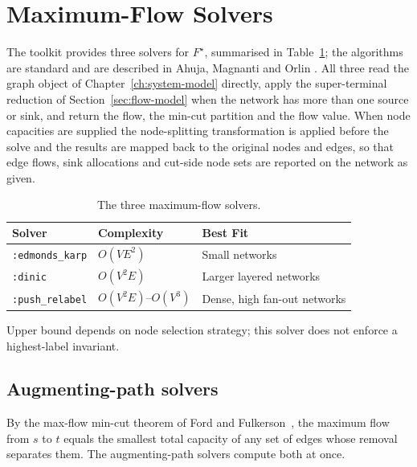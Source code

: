 \documentclass[12pt]{report}
\begin{document}
\clearpage

\section{Maximum-Flow Solvers}
\label{sec:flow-solvers}
The toolkit provides three solvers for $F^\star$, summarised in Table~\ref{tab:solver_comparison}; the algorithms are standard and are described in Ahuja, Magnanti and Orlin \cite{ahuja_network_2014}. All three read the graph object of Chapter~\ref{ch:system-model} directly, apply the super-terminal reduction of Section~\ref{sec:flow-model} when the network has more than one source or sink, and return the flow, the min-cut partition and the flow value. When node capacities are supplied the node-splitting transformation is applied before the solve and the results are mapped back to the original nodes and edges, so that edge flows, sink allocations and cut-side node sets are reported on the network as given.

\begin{table}[ht]
\centering
\begin{threeparttable}
\begin{tabular}{p{3cm} p{4.5cm} p{4.5cm}}
\toprule
\textbf{Solver} & \textbf{Complexity} & \textbf{Best Fit} \\
\midrule
\texttt{:edmonds\_karp} & $O(VE^2)$ & Small networks \\
\texttt{:dinic}         & $O(V^2E)$ & Larger layered networks \\
\texttt{:push\_relabel} & $O(V^2E)$--$O(V^3)$\tnote{a} & Dense, high fan-out networks \\
\bottomrule
\end{tabular}
\begin{tablenotes}
\footnotesize
\item[a] Upper bound depends on node selection strategy; this solver does not enforce a highest-label invariant.
\end{tablenotes}
\end{threeparttable}
\caption{The three maximum-flow solvers.}
\label{tab:solver_comparison}
\end{table}

\subsection{Augmenting-path solvers}

By the max-flow min-cut theorem of Ford and Fulkerson~\cite{ford1956,ford1962}, the maximum flow from $s$ to $t$ equals the smallest total capacity of any set of edges whose removal separates them. The augmenting-path solvers compute both at once.
\end{document}
